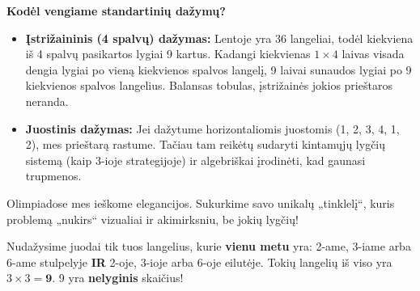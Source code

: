 \documentclass[11pt,a4paper]{scrartcl}
\newenvironment{solution}
    {\begin{list}{}{\setlength{\leftmargin}{10pt}\setlength{\rightmargin}{10pt}}\item[]}
    {\end{list}}
\begin{document}
\begin{solution}
\textbf{Kodėl vengiame standartinių dažymų?}
\begin{itemize}
    \item \textbf{Įstrižaininis (4 spalvų) dažymas:} Lentoje yra $36$ langeliai, todėl kiekviena iš 4 spalvų pasikartos lygiai 9 kartus. Kadangi kiekvienas $1 \times 4$ laivas visada dengia lygiai po vieną kiekvienos spalvos langelį, 9 laivai sunaudos lygiai po 9 kiekvienos spalvos langelius. Balansas tobulas, įstrižainės jokios prieštaros neranda.
    \item \textbf{Juostinis dažymas:} Jei dažytume horizontaliomis juostomis (1, 2, 3, 4, 1, 2), mes prieštarą rastume. Tačiau tam reikėtų sudaryti kintamųjų lygčių sistemą (kaip 3-ioje strategijoje) ir algebriškai įrodinėti, kad gaunasi trupmenos. 
\end{itemize}

Olimpiadose mes ieškome elegancijos. Sukurkime savo unikalų „tinklelį“, kuris problemą „nukirs“ vizualiai ir akimirksniu, be jokių lygčių! 

Nudažysime juodai tik tuos langelius, kurie \textbf{vienu metu} yra: 
2-ame, 3-iame arba 6-ame stulpelyje \textbf{IR} 2-oje, 3-ioje arba 6-oje eilutėje. 
Tokių langelių iš viso yra $3 \times 3 = \mathbf{9}$. 9 yra \textbf{nelyginis} skaičius!

\begin{center}
\end{center}


\end{solution}
\end{document}
